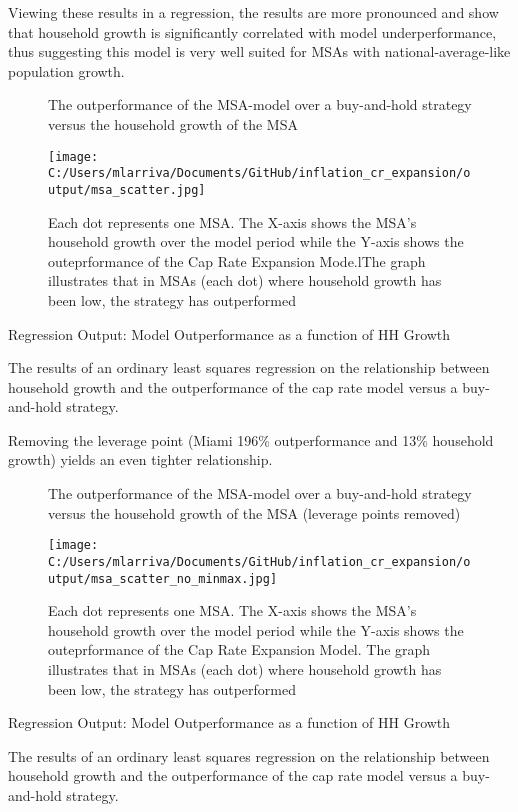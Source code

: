 Viewing these results in a regression, the results are more pronounced and show that household growth is significantly correlated with model underperformance, thus suggesting this model is very well suited for MSAs with national-average-like population growth. 

\begin{figure}[H]
\centering
\caption*{The outperformance of the MSA-model over a buy-and-hold strategy versus the household growth of the MSA}
\texttt{[image: C:/Users/mlarriva/Documents/GitHub/inflation\_cr\_expansion/output/msa\_scatter.jpg]}
\caption{Each dot represents one MSA. The X-axis shows the MSA's household growth over the model period while the Y-axis shows the outeprformance of the Cap Rate Expansion Mode.lThe graph illustrates that in MSAs (each dot) where household growth has been low, the strategy has outperformed}
\end{figure}

\begin{table}[H]
\centering
\caption*{Regression Output: Model Outperformance as a function of HH Growth}
\caption{The results of an ordinary least squares regression on the relationship between household growth and the outperformance of the cap rate model versus a buy-and-hold strategy.}
\end{table}
Removing the leverage point (Miami 196\% outperformance and 13\% household growth) yields an even tighter relationship.

\begin{figure}[H]
\centering
\caption*{The outperformance of the MSA-model over a buy-and-hold strategy versus the household growth of the MSA (leverage points removed)}
\texttt{[image: C:/Users/mlarriva/Documents/GitHub/inflation\_cr\_expansion/output/msa\_scatter\_no\_minmax.jpg]}
\caption{Each dot represents one MSA. The X-axis shows the MSA's household growth over the model period while the Y-axis shows the outeprformance of the Cap Rate Expansion Model. The graph illustrates that in MSAs (each dot) where household growth has been low, the strategy has outperformed}
\end{figure}

\begin{table}[H]
\centering
\caption*{Regression Output: Model Outperformance as a function of HH Growth}
\caption{The results of an ordinary least squares regression on the relationship between household growth and the outperformance of the cap rate model versus a buy-and-hold strategy.}
\end{table}

